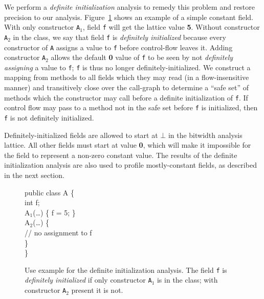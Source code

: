 \documentclass{acmconf}
\begin{document}
We perform a {\it definite initialization} analysis to remedy this
problem and restore precision to our analysis.
Figure~\ref{fig:definit-example} shows an example of a simple
constant field.
With only constructor {\tt A$_1$}, field {\tt f} will get the
lattice value {\bf 5}.  Without constructor {\tt A$_2$} in the class,
we say that field {\tt f} is {\it definitely initialized} because
every constructor of {\tt A} assigns a value to {\tt f} before
control-flow leaves it.  
Adding constructor {\tt A$_2$} allows the
default {\bf 0} value of {\tt f} to be seen by not {\it definitely
  assigning} a value to {\tt f}; {\tt f} is thus no longer
definitely-initialized.  We construct a mapping from methods to all
fields which they may read (in a flow-insensitive manner) and
transitively close over the call-graph to determine a ``safe set'' of
methods which the constructor may call before a definite
initialization of {\tt f}.  If control flow may pass to a method not
in the safe set before {\tt f} is initialized, then {\tt f} is not
definitely initialized.

Definitely-initialized fields are allowed to start at $\bot$ in the
bitwidth analysis lattice.  All other fields must start at value
{\bf 0}, which will make it impossible for the field to represent a
non-zero constant value.  The results of the definite initialization
analysis are also used to profile mostly-constant fields, as described
in the next section.

\begin{figure}
\begin{samplecode}
public class A \{\\
\>int f;\\
\>A$_1$(\ldots) \{ f = 5; \}\\
\>A$_2$(\ldots) \{\\
\>\>// no assignment to f\\
\>\}\\
\}\\
\end{samplecode}
\caption{Use example for the definite initialization analysis.
The field {\tt f} is {\it definitely initialized} if only constructor
{\tt A$_1$} is in the class; with constructor {\tt A$_2$} present it
is not.}
\label{fig:definit-example}
\end{figure}
\end{document}
